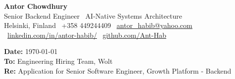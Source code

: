 \documentclass[a4paper,11pt]{article}
\begin{document}
\begin{center}
    {\Huge {}\selectfont \textbf{Antor Chowdhury}} \\[4pt]
    {\large {}\selectfont Senior Backend Engineer \textbar\ AI-Native Systems Architecture} \\[4pt]
    \small
    Helsinki, Finland \textbar\ +358 449244409 \textbar\ 
    \href{mailto:antor_habib@yahoo.com}{\underline{antor\_habib@yahoo.com}} \textbar\ 
    \href{https://www.linkedin.com/in/antor-habib/}{\underline{linkedin.com/in/antor-habib/}} \textbar\ 
    \href{https://github.com/Ant-Hab}{\underline{github.com/Ant-Hab}}
\end{center}

\vspace{10pt}

\noindent \textbf{Date:} \today \\
\noindent \textbf{To:} Engineering Hiring Team, Wolt \\
\noindent \textbf{Re:} Application for Senior Software Engineer, Growth Platform - Backend

\vspace{12pt}
\end{document}
